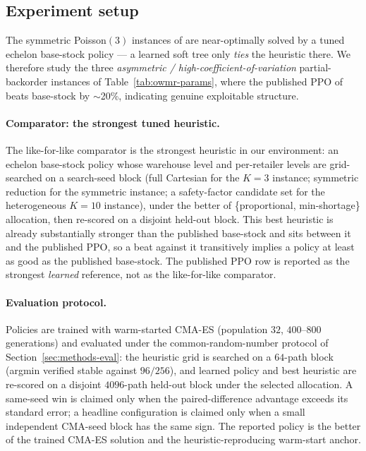 \documentclass[11pt]{article}
\begin{document}
\subsection{Experiment setup}
\label{sec:owmr-setup}

The symmetric Poisson$(3)$ instances of \citet{kaynov2024owmr} are near-optimally solved by a tuned
echelon base-stock policy --- a learned soft tree only \emph{ties} the heuristic there. We therefore
study the three \emph{asymmetric / high-coefficient-of-variation} partial-backorder instances of
Table~\ref{tab:owmr-params}, where the published PPO of \citet{kaynov2024owmr} beats base-stock by
$\sim$20\%, indicating genuine exploitable structure.

\paragraph{Comparator: the strongest tuned heuristic.}
The like-for-like comparator is the strongest heuristic in our environment: an echelon base-stock policy whose
warehouse level and per-retailer levels are grid-searched on a search-seed block (full Cartesian for
the $K{=}3$ instance; symmetric reduction for the symmetric instance; a safety-factor candidate set
for the heterogeneous $K{=}10$ instance), under the better of \{proportional,
min-shortage\} allocation, then re-scored on a disjoint held-out block. This best heuristic is already
substantially stronger than the published base-stock and sits between it and the published PPO,
so a beat against it transitively implies a policy at least as good as the published base-stock. The
published PPO row is reported as the strongest \emph{learned} reference, not as the like-for-like comparator.

\paragraph{Evaluation protocol.}
Policies are trained with warm-started CMA-ES (population $32$, $400$--$800$ generations) and
evaluated under the common-random-number protocol of
Section~\ref{sec:methods-eval}: the heuristic grid is searched on a $64$-path block (argmin verified
stable against $96/256$), and learned policy and best heuristic are re-scored on a disjoint $4096$-path held-out
block under the selected allocation. A same-seed win is claimed only when the paired-difference
advantage exceeds its standard error; a headline configuration is claimed only when a small
independent CMA-seed block has the same sign. The reported policy is the better of the trained CMA-ES
solution and the heuristic-reproducing warm-start anchor.
\end{document}
